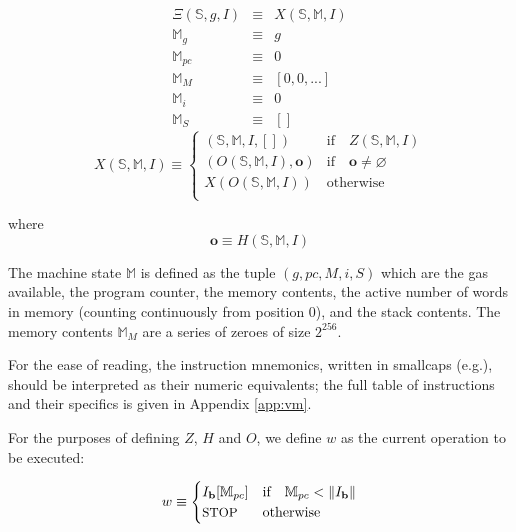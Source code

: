 \documentclass[9pt,oneside]{amsart}
\makeatletter
\newcommand*\eg{e.g.\@\xspace}
\makeatother
\begin{document}
\begin{multicols}{2}
\begin{eqnarray}
\Xi(\mathbb{S}, g, I) & \equiv & X(\mathbb{S}, \mathbb{M}, I) \\
\mathbb{M}_g & \equiv & g \\
\mathbb{M}_{pc} & \equiv & 0 \\
\mathbb{M}_M & \equiv & [0, 0, ...] \\
\mathbb{M}_i & \equiv & 0 \\
\mathbb{M}_S & \equiv & []
\end{eqnarray}
\begin{equation}
X(\mathbb{S}, \mathbb{M}, I) \equiv \begin{cases}
(\mathbb{S}, \mathbb{M}, I, []) & \text{if} \quad Z(\mathbb{S}, \mathbb{M}, I)\\
(O(\mathbb{S}, \mathbb{M}, I), \mathbf{o}) & \text{if} \quad \mathbf{o} \neq \varnothing\\
X(O(\mathbb{S}, \mathbb{M}, I)) & \text{otherwise}\\
\end{cases}
\end{equation}

where
\begin{equation}
\mathbf{o} \equiv H(\mathbb{S}, \mathbb{M}, I)
\end{equation}

The machine state $\mathbb{M}$ is defined as the tuple $(g, pc, M, i, S)$ which are the gas available, the program counter, the memory contents, the active number of words in memory (counting continuously from position 0), and the stack contents. The memory contents $\mathbb{M}_M$ are a series of zeroes of size $2^{256}$.

For the ease of reading, the instruction mnemonics, written in smallcaps (\eg {}), should be interpreted as their numeric equivalents; the full table of instructions and their specifics is given in Appendix \ref{app:vm}.

For the purposes of defining $Z$, $H$ and $O$, we define $w$ as the current operation to be executed:

\begin{equation}
w \equiv \begin{cases} I_\mathbf{b}[\mathbb{M}_{pc}] & \text{if} \quad \mathbb{M}_{pc} < \lVert I_\mathbf{b} \rVert \\
\text{\small STOP} & \text{otherwise}
\end{cases}
\end{equation}


\end{multicols}
\end{document}
